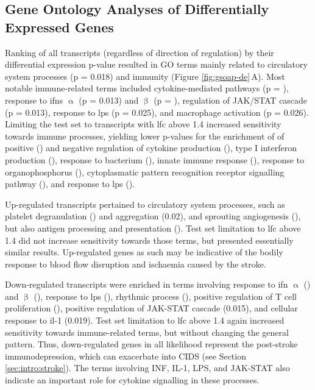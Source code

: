 \subsection{Gene Ontology Analyses of Differentially Expressed Genes} \label{sec:stroke:large-rna-go}
Ranking of all transcripts (regardless of direction of regulation) by their differential expression p-value resulted in GO terms mainly related to circulatory system processes (p = 0.018) and immunity (Figure \ref{fig:gsoap-de}\,A). Most notable immune-related terms included cytokine-mediated pathways (p = ), response to \acp{ifn} $\upalpha$ (p = 0.013) and $\upbeta$ (p = ), regulation of JAK/STAT cascade (p = 0.013), response to \ac{lps} (p = 0.025), and macrophage activation (p = 0.026). Limiting the test set to transcripts with \ac{lfc} above 1.4\,\,increased sensitivity towards immune processes, yielding lower p-values for the enrichment of of positive () and negative regulation of cytokine production (), type I interferon production (), response to bacterium (), innate immune response (), response to organophosphorus (), cytoplasmatic pattern recognition receptor signalling pathway (), and response to \ac{lps} ().

Up-regulated transcripts pertained to circulatory system processes, such as platelet degranulation () and aggregation (0.02), and sprouting angiogenesis (), but also antigen processing and presentation (). Test set limitation to \ac{lfc} above 1.4 did not increase sensitivity towards those terms, but presented essentially similar results. Up-regulated genes as such may be indicative of the bodily response to blood flow disruption and ischaemia caused by the stroke. 

Down-regulated transcripts were enriched in terms involving response to \ac{ifn} $\upalpha$ () and $\upbeta$ (), response to \ac{lps} (), rhythmic process (), positive regulation of T cell proliferation (), positive regulation of JAK-STAT cascade (0.015), and cellular response to \ac{il}-1 (0.019). Test set limitation to \ac{lfc} above 1.4 again increased sensitivity towards immune-related terms, but without changing the general pattern. Thus, down-regulated genes in all likelihood represent the post-stroke immunodepression, which can exacerbate into CIDS (see Section \ref{sec:intro:stroke}). The terms involving INF, IL-1, LPS, and JAK-STAT also indicate an important role for cytokine signalling in these processes.

